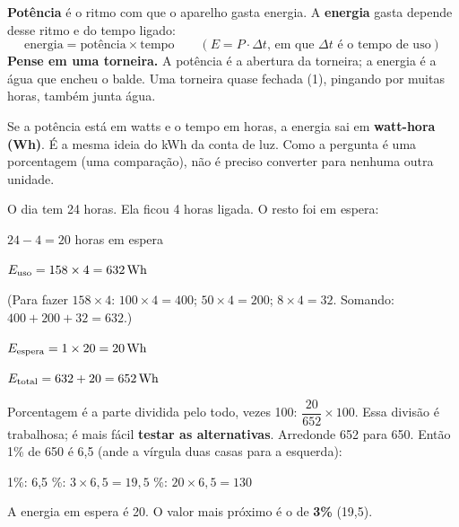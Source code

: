 \begin{enunciado}

\end{enunciado}


\begin{ideia}
\textbf{Potência} é o ritmo com que o aparelho gasta energia. A \textbf{energia} gasta depende desse ritmo e do tempo ligado:
\[ \text{energia} = \text{potência} \times \text{tempo} \qquad (E = P \cdot \Delta t\text{, em que } \Delta t \text{ é o tempo de uso}) \]
\textbf{Pense em uma torneira.} A potência é a abertura da torneira; a energia é a água que encheu o balde. Uma torneira
quase fechada (1), pingando por muitas horas, também junta água.

Se a potência está em watts e o tempo em horas, a energia sai em \textbf{watt-hora (Wh)}. É a mesma ideia do kWh da conta de luz.
Como a pergunta é uma porcentagem (uma comparação), não é preciso converter para nenhuma outra unidade.
\end{ideia}

\passoapasso
{}
O dia tem 24 horas. Ela ficou 4 horas ligada. O resto foi em espera:
\begin{conta}
$24 - 4 = 20$ horas em espera
\end{conta}

\begin{conta}
$E_{\text{uso}} = 158 \times 4 = 632\,\text{Wh}$
\end{conta}
(Para fazer $158 \times 4$: $100 \times 4 = 400$; $50 \times 4 = 200$; $8 \times 4 = 32$. Somando: $400 + 200 + 32 = 632$.)

\begin{conta}
$E_{\text{espera}} = 1 \times 20 = 20\,\text{Wh}$
\end{conta}

\begin{conta}
$E_{\text{total}} = 632 + 20 = 652\,\text{Wh}$
\end{conta}

Porcentagem é a parte dividida pelo todo, vezes 100: $\dfrac{20}{652} \times 100$. Essa divisão é trabalhosa; é mais fácil
\textbf{testar as alternativas}. Arredonde 652 para 650. Então 1\% de 650 é 6,5 (ande a vírgula duas casas para a esquerda):
\begin{conta}
1\%: 6,5 \qquad{}\%: $3 \times 6{,}5 = 19{,}5$ \qquad{}\%: $20 \times 6{,}5 = 130$
\end{conta}
A energia em espera é 20. O valor mais próximo é o de \textbf{3\%} (19,5).

